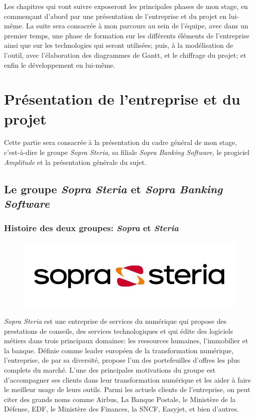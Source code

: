 \documentclass{polytech/polytech}
\begin{document}
Les chapitres qui vont suivre exposeront les principales phases de mon stage, en commençant d'abord par une présentation de l'entreprise et du projet en lui-même. La suite sera consacrée à mon parcours au sein de l'équipe, avec dans un premier temps, une phase de formation sur les différents éléments de l'entreprise ainsi que sur les technologies qui seront utilisées; puis, à la modélisation de l'outil, avec l'élaboration des diagrammes de Gantt, et le chiffrage du projet; et enfin le développement en lui-même. 

\part{Présentation de l'entreprise et du projet}

Cette partie sera consacrée à la présentation du cadre général de mon stage, c'est-à-dire le groupe \textit{Sopra Steria}, sa filiale \textit{Sopra Banking Software}, le progiciel \textit{Amplitude} et la présentation générale du sujet. 

\chapter{Le groupe \textit{Sopra Steria} et \textit{Sopra Banking Software}}

\section{Histoire des deux groupes: \textit{Sopra} et \textit{Steria}}

\begin{figure}
	\includegraphics[scale=1]{images/sopralogo}
\end{figure}

\textit{Sopra Steria} est une entreprise de services du numérique qui propose des prestations de conseils, des services technologiques et qui édite des logiciels métiers dans trois principaux domaines: les ressources humaines, l'immobilier et la banque. Définie comme leader européen de la transformation numérique, l'entreprise, de par sa diversité, propose l'un des portefeuilles d'offres les plus complets du marché. L'une des principales motivations du groupe est d'accompagner ses clients dans leur transformation numérique et les aider à faire le meilleur usage de leurs outils. Parmi les actuels clients de l'entreprise, on peut citer des grands noms comme Airbus, La Banque Postale, le Ministère de la Défense, EDF, le Ministère des Finances, la SNCF, Easyjet, et bien d'autres.  
\end{document}
